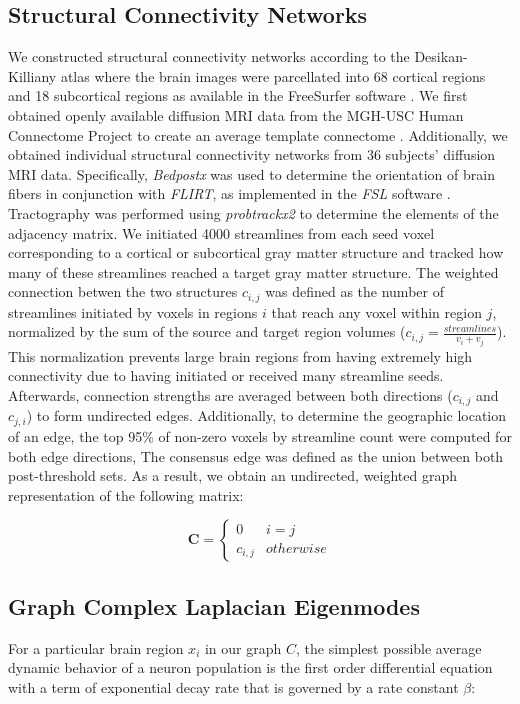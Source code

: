 \documentclass{article}
\begin{document}
\subsection{Structural Connectivity Networks} We constructed structural connectivity networks according to the Desikan-Killiany atlas where the brain images were parcellated into 68 cortical regions and 18 subcortical regions as available in the FreeSurfer software \cite{Fischl2002, Desikan2006}. We first obtained openly available diffusion MRI data from the MGH-USC Human Connectome Project to create an average template connectome \cite{McNab2013}. Additionally, we obtained individual structural connectivity networks from 36 subjects' diffusion MRI data. Specifically, \textit{Bedpostx} was used to determine the orientation of brain fibers in conjunction with \textit{FLIRT}, as implemented in the \textit{FSL} software \cite{Jenkinson2012}. Tractography was performed using \textit{probtrackx2} to determine the elements of the adjacency matrix. We initiated 4000 streamlines from each seed voxel corresponding to a cortical or subcortical gray matter structure and tracked how many of these streamlines reached a target gray matter structure. The weighted connection betwen the two structures $c_{i,j}$ was defined as the number of streamlines initiated by voxels in regions $i$ that reach any voxel within region $j$, normalized by the sum of the source and target region volumes ($c_{i,j} = \frac{streamlines}{v_i + v_j}$). This normalization prevents large brain regions from having extremely high connectivity due to having initiated or received many streamline seeds. Afterwards, connection strengths are averaged between both directions ($c_{i,j}$ and $c_{j,i}$) to form undirected edges. Additionally, to determine the geographic location of an edge, the top 95\% of non-zero voxels by streamline count were computed for both edge directions, The consensus edge was defined as the union between both post-threshold sets. As a result, we obtain an undirected, weighted graph representation of the following matrix:

\[ \mathbf{C} = \begin{cases}
    0 & i = j\\
    c_{i,j} & otherwise
    \end{cases}
    \]

\subsection{Graph Complex Laplacian Eigenmodes}
For a particular brain region $x_i$ in our graph $C$, the simplest possible average dynamic behavior of a neuron population is the first order differential equation with a term of exponential decay rate that is governed by a rate constant $\beta$:
\end{document}
